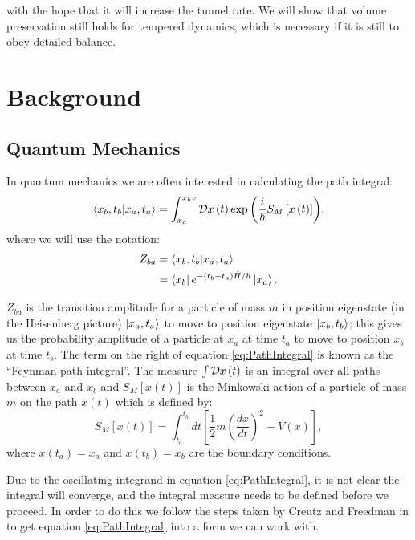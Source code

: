 \documentclass[12pt]{article}
\begin{document}
with the hope that it will increase the tunnel rate. We will show that volume preservation still holds for tempered dynamics, which is necessary if it is still to obey detailed balance.


\section{Background}
    \subsection{Quantum Mechanics}
        \label{sec:QuantumMechanics}
        In quantum mechanics we are often interested in calculating the path integral:
        \begin{equation}
            \label{eq:PathIntegral}
            \braket{x_b,t_b|x_a,t_a} = \int_{x_a}^{x_bv} {\cal D} x\left(t\right) \exp{\left(\frac{i}{\hbar} S_M\left[x\left(t\right)\right]\right)},
        \end{equation}
        where we will use the notation:
        \begin{align}
            \label{eq:PathIntegralZ_fi}
            Z_{ba} & = \braket{x_b,t_b|x_a,t_a} \\
                   & = \bra{x_b}e^{-\left(t_b-t_a\right)\hat{H}/\hbar}\ket{x_a}.
        \end{align}

        $Z_{ba}$ is the transition amplitude for a particle of mass $m$ in position eigenstate (in the Heisenberg picture) $\ket{x_a,t_a}$ to move to position eigenstate $\ket{x_b,t_b}$; this gives us the probability amplitude of a particle at $x_a$ at time $t_a$ to move to position $x_b$ at time $t_b$. The term on the right of equation \ref{eq:PathIntegral} is known as the ``Feynman path integral''. The measure $\int {\cal D} x\left(t\right)$ is an integral over all paths between $x_a$ and $x_b$ and $S_M\left[x\left(t\right)\right]$ is the Minkowski action of a particle of mass $m$ on the path $x\left(t\right)$ which is defined by:
        \begin{equation}
            \label{eq:MinkowskiAction}
            S_M\left[x\left(t\right)\right] = \int_{t_a}^{t_b} dt \left[\frac{1}{2}m\left(\frac{dx}{dt}\right)^2 - V(x)\right],
        \end{equation}
        where $x\left(t_a\right) = x_a$ and $x\left(t_b\right) = x_b$ are the boundary conditions.

        Due to the oscillating integrand in equation \ref{eq:PathIntegral}, it is not clear the integral will converge, and the integral measure needs to be defined before we proceed. In order to do this we follow the steps taken by Creutz and Freedman in \cite{creutz_freedman_1981} to get equation \ref{eq:PathIntegral} into a form we can work with.
\end{document}
